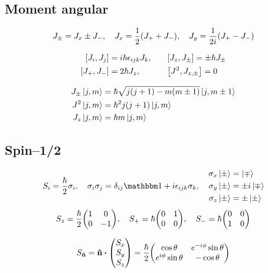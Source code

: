 \newpage
\subsection{Moment angular}
\begin{align*}
	J_{\pm} = J_{x} \pm J_{-} \qc J_{x} = \frac{1}{2} \qty(J_{+} + J_{-}) \qc J_{y} = \frac{1}{2i} \qty(J_{+} - J_{-})
\end{align*}

\begin{alignat*}{2}
	\qty[J_{i},J_{j}] &= i \hbar \epsilon_{ijk} J_{k} \qc && \qty[J_{z},J_{\pm}] = \pm \hbar J_{\pm} \\
	\qty[J_{+},J_{-}] &= 2\hbar J_{z} \qc && \qty[J^{2},J_{z, \pm}] = 0
\end{alignat*}

\begin{align*}
\begin{aligned}
	J_{\pm} \ket{j,m} &= \hbar \sqrt{j(j + 1) - m(m \pm 1)} \ket{j,m \pm 1} \\
	J^{2} \ket{j,m} &= \hbar^{2} j(j + 1) \ket{j,m} \\
	J_{z} \ket{j,m} &= \hbar m \ket{j,m}
\end{aligned}
\end{align*}

\subsection{Spin--1/2}
\begin{align*}
	S_{i} = \frac{\hbar}{2} \sigma_{i} \qc \sigma_{i} \sigma_{j} = \delta_{ij} \bbid + i \epsilon_{ijk} \sigma_{k} \qc
	\begin{aligned}
		\sigma_{x} \ket{\pm} &= \ket{\mp} \\
		\sigma_{y} \ket{\pm} &= \pm i \ket{\mp} \\
		\sigma_{z} \ket{\pm} &= \pm \ket{\pm}
	\end{aligned}
\end{align*}
\begin{align*}
	S_{z} = \frac{\hbar}{2} \mqty(\dmat[0]{1,-1}) \qc S_{+} = \hbar \mqty(\admat[0]{1,0}) \qc S_{-} = \hbar \mqty(\admat[0]{0,1})
\end{align*}

\begin{align*}
	S_{\vu{n}} = \vu{n} \vdot \mqty(S_{x} \\ S_{y} \\ S_{z}) = \frac{\hbar}{2} \mqty(\cos \theta & e^{-i\phi} \sin \theta \\ e^{i\phi} \sin \theta & - \cos \theta)
\end{align*}

